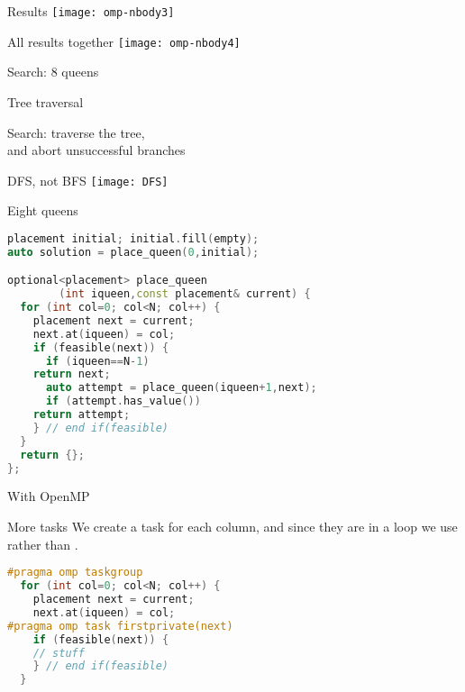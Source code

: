 \documentclass[11pt,headernav]{beamer}
\begin{document}
\begin{numberedframe}{Results}
\texttt{[image: omp-nbody3]}
\end{numberedframe}

\begin{numberedframe}{All results together}
  \texttt{[image: omp-nbody4]}
\end{numberedframe}

\begin{frame}
  {Search: 8 queens}
\end{frame}

\begin{numberedframe}{Tree traversal}
\begin{multicols}{2}
  Search: traverse the tree, \\
  and abort unsuccessful branches

  DFS, not BFS
  \vfill\hbox{}
  \columnbreak
  \texttt{[image: DFS]}
\end{multicols}
\end{numberedframe}

\begin{numberedframe}{Eight queens}
\begin{lstlisting}[language=C++]
placement initial; initial.fill(empty);
auto solution = place_queen(0,initial);

optional<placement> place_queen
        (int iqueen,const placement& current) {
  for (int col=0; col<N; col++) {
    placement next = current;
    next.at(iqueen) = col;
    if (feasible(next)) {
      if (iqueen==N-1)
	return next;
      auto attempt = place_queen(iqueen+1,next);
      if (attempt.has_value())
	return attempt;
    } // end if(feasible)
  }
  return {};
};
\end{lstlisting}
\end{numberedframe}

\begin{numberedframe}{With OpenMP}
\end{numberedframe}

\begin{numberedframe}{More tasks}
We create a task for each column, and since they are in a loop
we use  rather than .
\begin{lstlisting}[language=C++]
#pragma omp taskgroup
  for (int col=0; col<N; col++) {
    placement next = current;
    next.at(iqueen) = col;
#pragma omp task firstprivate(next)
    if (feasible(next)) {
    // stuff
    } // end if(feasible)
  }
\end{lstlisting}
\end{numberedframe}
\end{document}
